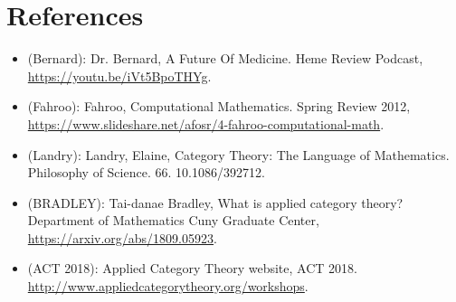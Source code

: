 \section*{References}

\begin{itemize}

\item (Bernard): Dr. Bernard, A Future Of Medicine. Heme Review Podcast, \url{https://youtu.be/iVt5BpoTHYg}.

\item (Fahroo): Fahroo, Computational Mathematics. Spring Review 2012, \url{https://www.slideshare.net/afosr/4-fahroo-computational-math}.

\item (Landry): Landry, Elaine, Category Theory: The Language of Mathematics. Philosophy of Science. 66. 10.1086/392712.


\item (BRADLEY): Tai-danae Bradley, What is applied category theory? Department of Mathematics Cuny Graduate Center, \url{https://arxiv.org/abs/1809.05923}.


\item (ACT 2018): Applied Category Theory website, ACT 2018. \url{http://www.appliedcategorytheory.org/workshops}.

\end{itemize}

